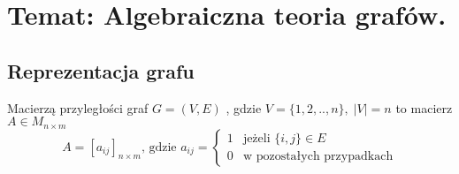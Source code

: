 \section[Wykład 4: 16-III-2017 - Temat: Algebraiczna teoria grafów.]{Temat: Algebraiczna teoria grafów.}
\subsection{Reprezentacja grafu}
\begin{definition} Macierzą przyległości graf $G=(V,E)$ , gdzie $V=\{1,2,..,n\},\; |V|=n$ to macierz $A\in M_{n\times m}$
$$A=[a_{ij}]_{n\times m}\text{, gdzie } a_{ij}=\left\{\begin{matrix}
1 & \text{jeżeli } \{i,j\}\in E\\
0 & \text{w pozostałych przypadkach}
\end{matrix}\right.$$
\end{definition}
